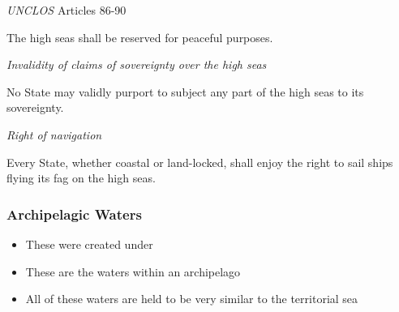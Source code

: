 \begin{conventiondetails}{\textit{UNCLOS} Articles 86-90}
    \vspace{\baselineskip}

    The high seas shall be reserved for peaceful purposes.
    
    \textit{Invalidity of claims of sovereignty over the high seas}

    \vspace{\baselineskip}

    No State may validly purport to subject any part of the high seas to its sovereignty.

    \textit{Right of navigation}

    \vspace{\baselineskip}
    Every State, whether coastal or land-locked, shall enjoy the right to sail ships flying its fag on the high seas.
\end{conventiondetails}

\subsubsection{Archipelagic Waters}
\begin{itemize}
    \item These were created under 
    \item These are the waters within an archipelago
    \item All of these waters are held to be very similar to the territorial sea
\end{itemize}

